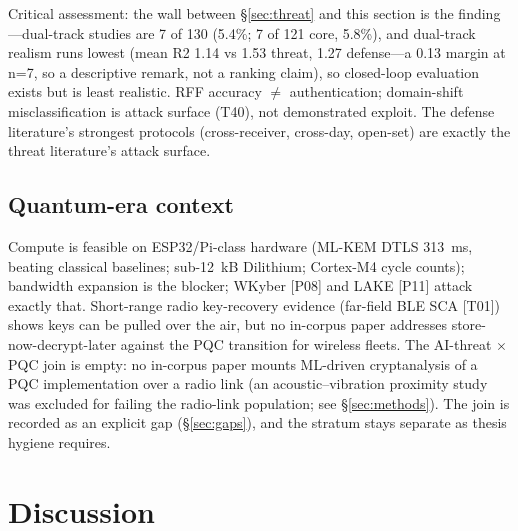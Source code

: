Critical assessment: the wall between \S\ref{sec:threat} and this section is the finding---dual-track studies are 7 of 130 (5.4\%; 7 of 121 core, 5.8\%), and dual-track realism runs lowest (mean R2 1.14 vs 1.53 threat, 1.27 defense---a 0.13 margin at n=7, so a descriptive remark, not a ranking claim), so closed-loop evaluation exists but is least realistic. RFF accuracy $\ne$ authentication; domain-shift misclassification is attack surface (T40), not demonstrated exploit. The defense literature's strongest protocols (cross-receiver, cross-day, open-set) are exactly the threat literature's attack surface.

\subsection{Quantum-era context}
\label{sec:pqc}
Compute is feasible on ESP32/Pi-class hardware (ML-KEM DTLS 313~ms, beating classical baselines; sub-12~kB Dilithium; Cortex-M4 cycle counts); bandwidth expansion is the blocker; WKyber [P08] and LAKE [P11] attack exactly that. Short-range radio key-recovery evidence (far-field BLE SCA [T01]) shows keys can be pulled over the air, but no in-corpus paper addresses store-now-decrypt-later against the PQC transition for wireless fleets. The AI-threat $\times$ PQC join is empty: no in-corpus paper mounts ML-driven cryptanalysis of a PQC implementation over a radio link (an acoustic--vibration proximity study was excluded for failing the radio-link population; see \S\ref{sec:methods}). The join is recorded as an explicit gap (\S\ref{sec:gaps}), and the stratum stays separate as thesis hygiene requires.

\section{Discussion}
